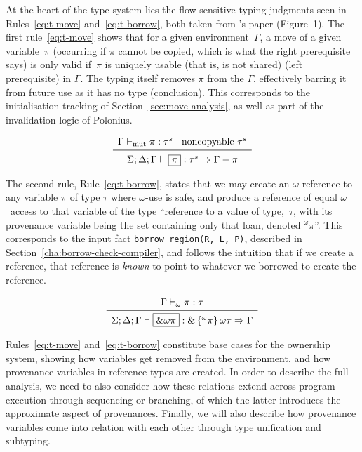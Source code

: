 \documentclass[11pt,a4paper,twoside,openany,draft]{report}
\newcommand{\InDatalog}[1]{\texttt{#1}}
\newcommand{\expression}[1]{\boxed{#1}}
\newcommand{\ntyperule}[2]{\begin{array}{c}#1\\\midrule\raisebox{1pt}{\strut}#2\end{array}}
\begin{document}
At the heart of the type system lies the flow-sensitive typing judgments seen in
Rules~\ref{eq:t-move} and~\ref{eq:t-borrow}, both taken from
\citeauthor*{weiss_oxide:_2019}'s paper (Figure~1). The first
rule~\eqref{eq:t-move} shows that for a given environment~$\Gamma$, a move of a
given variable~$\pi$ (occurring if $\pi$ cannot be copied, which is what the
right prerequisite says) is only valid if~$\pi$ is uniquely usable (that is, is
not shared) (left prerequisite) in $\Gamma$. The typing itself removes $\pi$
from the $\Gamma$, effectively barring it from future use as it has no type
(conclusion). This corresponds to the initialisation tracking of
Section~\ref{sec:move-analysis}, as well as part of the invalidation logic
of Polonius.

\begin{equation}\label{eq:t-move}
  \ntyperule{
    \Gamma \vdash_{\text{mut}} \pi : \tau^s \:\:\:\:
    \text{noncopyable } \tau^s}
  {
    \Sigma ; \Delta ; \Gamma \vdash \expression{\pi} : \tau^s \Rightarrow \Gamma - \pi
  }
\end{equation}

The second rule, Rule~\eqref{eq:t-borrow}, states that we may create an
$\omega$-reference to any variable $\pi$ of type $\tau$ where $\omega$-use is
safe, and produce a reference of equal $\omega$~access to that variable of the
type ``reference to a value of type,~$\tau$, with its provenance variable being
the set containing only that loan, denoted $^{\omega}\pi$''. This corresponds to
the input fact \InDatalog{borrow_region(R, L, P)}, described in
Section~\ref{cha:borrow-check-compiler}, and follows the intuition that if we
create a reference, that reference is \emph{known} to point to whatever we
borrowed to create the reference.

\begin{equation}\label{eq:t-borrow}
  \ntyperule{
    \Gamma \vdash_{\omega} \pi : \tau}
  {
    \Sigma ; \Delta ; \Gamma \vdash \expression{\&\omega \pi} : \& \left \{ ^{\omega}\pi\right \} \omega \tau \Rightarrow \Gamma
  }
\end{equation}

Rules~\eqref{eq:t-move} and~\eqref{eq:t-borrow} constitute base cases for the
ownership system, showing how variables get removed from the environment, and
how provenance variables in reference types are created. In order to describe
the full analysis, we need to also consider how these relations extend across
program execution through sequencing or branching, of which the latter
introduces the approximate aspect of provenances. Finally, we will also describe
how provenance variables come into relation with each other through type
unification and subtyping.
\end{document}

